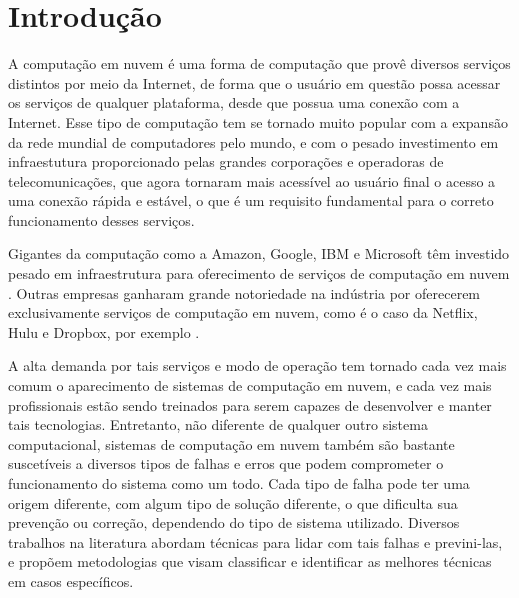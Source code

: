 \documentclass[
	12pt,				%
	oneside,			%
	a4paper,			%
	chapter=TITLE,		%
	english,			%
	french,				%
	spanish,			%
	brazil				%
	]{abntex2}
\begin{document}

\tableofcontents*
\cleardoublepage



\textual

\chapter{Introdução}
A computação em nuvem é uma forma de computação que provê diversos serviços distintos por meio da Internet, de forma que o usuário em questão possa acessar os serviços de qualquer plataforma, desde que possua uma conexão com a Internet. Esse tipo de computação tem se tornado muito popular com a expansão da rede mundial de computadores pelo mundo, e com o pesado investimento em infraestutura proporcionado pelas grandes corporações e operadoras de telecomunicações, que agora tornaram mais acessível ao usuário final o acesso a uma conexão rápida e estável, o que é um requisito fundamental para o correto funcionamento desses serviços.

Gigantes da computação como a Amazon, Google, IBM e Microsoft têm investido pesado em infraestrutura para oferecimento de serviços de computação em nuvem \cite{tsai2010service, lohr2007google}. Outras empresas ganharam grande notoriedade na indústria por oferecerem exclusivamente serviços de computação em nuvem, como é o caso da Netflix, Hulu e Dropbox, por exemplo \cite{berman2012cloud}. 

A alta demanda por tais serviços e modo de operação tem tornado cada vez mais comum o aparecimento de sistemas de computação em nuvem, e cada vez mais profissionais estão sendo treinados para serem capazes de desenvolver e manter tais tecnologias. Entretanto, não diferente de qualquer outro sistema computacional, sistemas de computação em nuvem também são bastante suscetíveis a diversos tipos de falhas e erros que podem comprometer o funcionamento do sistema como um todo. Cada tipo de falha pode ter uma origem diferente, com algum tipo de solução diferente, o que dificulta sua prevenção ou correção, dependendo do tipo de sistema utilizado. Diversos trabalhos na literatura abordam técnicas para lidar com tais falhas e previni-las, e propõem metodologias que visam classificar e identificar as melhores técnicas em casos específicos.
\end{document}
